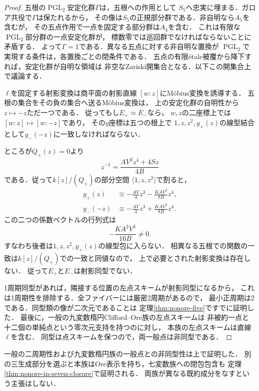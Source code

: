 \begin{proof}
五根の$\operatorname{PGL}_2$安定化群$\Gamma$は，五根への作用として
$S_5$へ忠実に埋まる．ガロア共役で$\Gamma$は保たれるから，
その像は$S_5$の正規部分群である．非自明なら$A_5$を含むが，
その五点作用で一点を固定する部分群は$A_4$を含む．
これは有限な$\operatorname{PGL}_2$部分群の一点安定化群が，
標数零では巡回群でなければならないことに矛盾する．
よって$\Gamma=1$である．異なる五点に対する非自明な置換が
$\operatorname{PGL}_2$で実現する条件は，各置換ごとの閉条件である．
五点の有限\'etale被覆から降下すれば，安定化群が自明な領域は
非空なZariski開集合となる．以下この開集合上で議論する．

$\ell$を固定する射影変換は商平面の射影直線
$[w:z]$にM\"obius変換を誘導する．
五根の集合をその負の集合へ送るM\"obius変換は，
上の安定化群の自明性から$z\mapsto-z$ただ一つである．
従ってもし$E_+\simeq E_-$なら，
$w,z$の二座標上では$[w:z]\mapsto[w:-z]$であり，
その$y$座標は五つの根上で
$1,z,z^2,y_+(z)$の線型結合として$y_-(-z)$に一致しなければならない．

ところが$Q_+(z)=0$より
\[
 z^{-1}=\frac{AV^2z^4+4Sz}{4B}
\]
である．従って$k[z]/(Q_+)$の部分空間
$\langle1,z,z^2\rangle$で割ると，
\[
 \begin{aligned}
 y_+(z)&\equiv-\frac{AV}{4}z^3-\frac{KAV^2}{8B}z^4,\\
 y_-(-z)&\equiv-\frac{AV}{4}z^3+\frac{KAV^2}{8B}z^4.
 \end{aligned}
\]
この二つの係数ベクトルの行列式は
\[
 -\frac{KA^2V^3}{16B}\ne0.
\]
すなわち後者は$1,z,z^2,y_+(z)$の線型包に入らない．
相異なる五根での関数の一致は$k[z]/(Q_+)$での一致と同値なので，
上で必要とされた射影変換は存在しない．
従って$E_+$と$E_-$は射影同型でない．

1周期同型があれば，隣接する位置の左点スキームが射影同型になるから，
これは1周期性を排除する．全ファイバーには厳密2周期があるので，
最小正周期は2である．同型類の像が二次元であることは
定理\ref{thm:nonore-five}ですでに証明した．
最後に，一般の九変数楕円Clifford--Ore族の左点スキームは
非被約一点と十二個の単純点という零次元支持を持つのに対し，
本族の左点スキームは直線$\ell$を含む．
同型は点スキームを保つので，両一般点は非同型である．
\end{proof}

\begin{remark}
一般の二周期性および九変数楕円族の一般点との非同型性は上で証明した．
別の三生成部分を選ぶと本族はOre表示を持ち，七変数族への閉包包含も
定理\ref{thm:nonore-in-seven-closure}で証明される．
両族が異なる既約成分をなすという主張はしない．
\end{remark}
